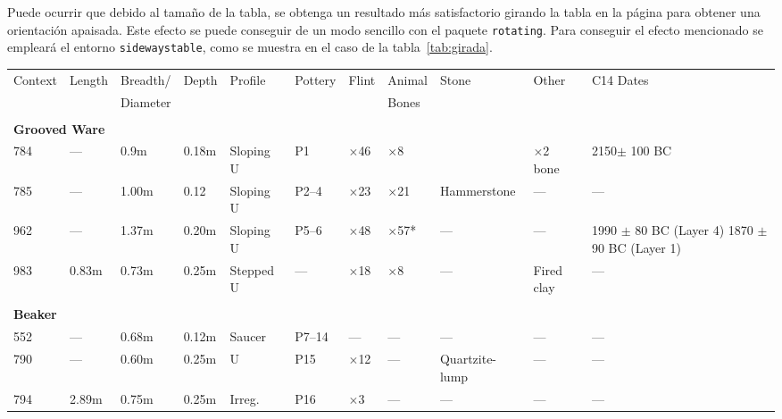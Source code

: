 \documentclass[11pt,a4paper]{article}
\begin{document}
Puede ocurrir que debido al tamaño de la tabla, se obtenga un resultado más satisfactorio girando la tabla en la página para obtener una orientación apaisada. Este efecto se puede conseguir de un modo sencillo con el paquete \texttt{rotating}. Para conseguir el efecto mencionado se empleará el entorno \texttt{sidewaystable}, como se muestra en el caso de la tabla~\ref{tab:girada}.
\begin{sidewaystable}
	\centering
	\caption[Ejemplo de tabla girada]{Tabla girada en una página}\label{tab:girada}
	\begin{tabular}{llllllllp{1in}lp{1in}}
		\toprule
		Context   &Length   &Breadth/   &Depth   &Profile   &Pottery   &Flint   &Animal   &Stone   &Other    &C14 Dates \\
		&         &Diameter   &        &          &          &        & 
		Bones&&&\\
		\midrule
		&&&&&&&&&&\\
		\multicolumn{10}{l}{\bf Grooved Ware}&\\
		784       &---        &0.9m       &0.18m   &Sloping U &P1       &$\times$46  &  $\times$8      &&       $\times$2 bone&  2150$\pm$ 100 BC\\
		785       &---        &1.00m      &0.12    &Sloping U &P2--4    &$\times$23  &  $\times$21     & Hammerstone &---&---\\
		962       &---        &1.37m      &0.20m   &Sloping U &P5--6    &$\times$48  &  $\times$57*    & ---&     ---&1990 $\pm$ 80 BC (Layer 4) 1870 $\pm$90 BC (Layer 1)\\
		983       &0.83m      &0.73m      &0.25m   &Stepped U &---      &$\times$18  &  $\times$8      & ---& Fired clay&---\\
		&&&&&&&&&&\\
		\multicolumn{10}{l}{\bf Beaker}&\\
		552       &---        &0.68m      &0.12m   &Saucer    &P7--14   &---           & ---       & ---       &---        &---\\
		790       &---        &0.60m      &0.25m   &U         &P15      &$\times$12    & ---       & Quartzite-lump&---    &---\\
		794       &2.89m      &0.75m      &0.25m   &Irreg.    &P16      &$\times$3     & ---       & ---       &---        &---\\
		\bottomrule
	\end{tabular}
\end{sidewaystable}
\end{document}
